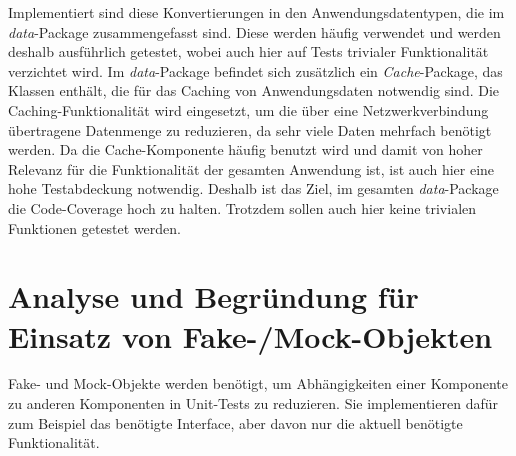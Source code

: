 \documentclass[12pt]{article}
\begin{document}
Implementiert sind diese Konvertierungen in den Anwendungsdatentypen, die im \textit{data}-Package zusammengefasst sind.
Diese werden häufig verwendet und werden deshalb ausführlich getestet, wobei auch hier auf Tests trivialer Funktionalität verzichtet wird.
\newline
Im \textit{data}-Package befindet sich zusätzlich ein \textit{Cache}-Package, das Klassen enthält, die für das Caching von Anwendungsdaten notwendig sind.
Die Caching-Funktionalität wird eingesetzt, um die über eine Netzwerkverbindung übertragene Datenmenge zu reduzieren, da sehr viele Daten mehrfach benötigt werden. 
Da die Cache-Komponente häufig benutzt wird und damit von hoher Relevanz für die Funktionalität der gesamten Anwendung ist, ist auch hier eine hohe Testabdeckung notwendig.
\newline
Deshalb ist das Ziel, im gesamten \textit{data}-Package die Code-Coverage hoch zu halten. Trotzdem sollen auch hier keine trivialen Funktionen getestet werden.
\newline
\newline




\newpage
\section{Analyse und Begründung für Einsatz von Fake-/Mock-Objekten}

Fake- und Mock-Objekte werden benötigt, um Abhängigkeiten einer Komponente zu anderen Komponenten in Unit-Tests zu reduzieren.
Sie implementieren dafür zum Beispiel das benötigte Interface, aber davon nur die aktuell benötigte Funktionalität.

\end{document}
